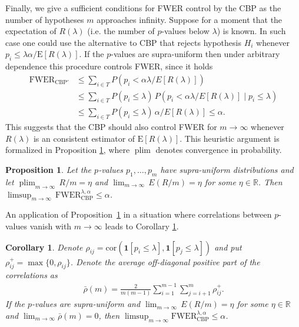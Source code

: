 \documentclass {imsart}
\newtheorem{Corollary}{Corollary}
\newtheorem{Proposition}{Proposition}
\newcommand{\FWERcb}{\mathrm{FWER}_{\mathrm{CBP}}^{\lambda,\alpha}}
\newcommand{\plim}{\mathop{\mathrm{plim}}}
\newcommand{\cor}{\mathrm{cor}}
\newcommand{\E}{\mathrm{E}}
\newcommand{\R}{\mathbb{R}}                 %
\def\mbf#1{\boldsymbol{#1}}                %
\begin{document}
Finally, we give a sufficient conditions for FWER control by the CBP as the number of hypotheses $m$ approaches infinity. Suppose for a moment that the expectation of $R(\lambda)$ (i.e. the number of $p$-values below $\lambda$) is known. In such case one could use the alternative to CBP that rejects hypothesis $H_i$ whenever $p_i\leq\lambda\alpha/\E[R(\lambda)]$. If the $p$-values are supra-uniform then under arbitrary dependence this procedure controls FWER, since it holds
\begin{align*}
\mathrm{FWER}_{\mathrm{CBP'}}&\leq\sum\nolimits_{i\in T} P(p_i<\alpha\lambda/E[R(\lambda)]) \\
&\leq\sum\nolimits_{i\in T} P(p_i\leq\lambda)\,P(p_i<\alpha\lambda/E[R(\lambda)]\mid p_i\leq\lambda) \\
&\leq\sum\nolimits_{i\in T} P(p_i\leq\lambda)\,\alpha/E[R(\lambda)]
\leq\alpha.
\end{align*}
This suggests that the CBP should also control FWER for $m\to\infty$ whenever $R(\lambda)$ is an consistent estimator of $\E[R(\lambda)]$. This heuristic argument is formalized in Proposition \ref{thm:exp_bonf}, where $\plim$ denotes convergence in probability.

\begin{Proposition}
\label{thm:exp_bonf}
Let the $p$-values $p_1,\ldots,p_m$ have supra-uniform distributions and let $\plim_{m\to\infty}\,R/m=\eta$ and $\lim_{m\to\infty}\,E(R/m)=\eta$ for some $\eta\in\R$. Then $\limsup_{m\to\infty}\,\FWERcb\leq\alpha$.
\end{Proposition}

An application of Proposition~\ref{thm:exp_bonf} in a situation where correlations between $p$-values vanish with $m\to\infty$ leads to Corollary \ref{corol:asymptotic}.

\begin{Corollary}
\label{corol:asymptotic}
Denote $\rho_{ij}=\cor(\mbf{1}[p_i\leq\lambda],\mbf{1}[{{p}_{j}}\leq\lambda])$ and put $\rho_{ij}^+=\max\{0,\rho_{ij}\}$. Denote the average off-diagonal positive part of the correlations as
\begin{align*}
\bar\rho(m)=\frac{2}{m(m-1)}\sum\limits_{i=1}^{m-1}{\sum\limits_{j=i+1}^{m}{{{\rho }_{ij}^{+}}}}.
\end{align*}
If the $p$-values are supra-uniform and $\lim_{m\to\infty}\,E(R/m)=\eta$ for some $\eta\in\R$ and $\lim_{m\to\infty}\bar\rho(m)=0$, then $\limsup_{m\to\infty}\FWERcb\leq\alpha $.
\end{Corollary}
\end{document}
